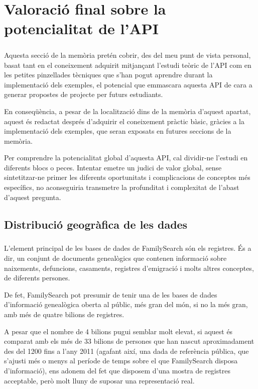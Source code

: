 \chapter{Valoració final sobre la potencialitat de l'API}

    \paragraph{}
    Aquesta secció de la memòria pretén cobrir, des del meu punt de vista personal, basat tant en el coneixement adquirit mitjançant l'estudi teòric de l'API com en les petites pinzellades tècniques que s'han pogut aprendre durant la implementació dels exemples, el potencial que emmascara aquesta API de cara a generar propostes de projecte per futurs estudiants.

    En conseqüència, a pesar de la localització dins de la memòria d'aquest apartat, aquest és redactat després d'adquirir el coneixement pràctic bàsic, gràcies a la implementació dels exemples, que seran exposats en futures seccions de la memòria.

    Per comprendre la potencialitat global d'aquesta API, cal dividir-ne l'estudi en diferents blocs o peces. Intentar emetre un judici de valor global, sense sintetitzar-ne primer les diferents oportunitats i complicacions de conceptes més específics, no aconseguiria transmetre la profunditat i complexitat de l'abast d'aquest pregunta.

\section{Distribució geogràfica de les dades}

    \paragraph{}
    L'element principal de les bases de dades de FamilySearch són els registres. És a dir, un conjunt de documents genealògics que contenen informació sobre naixements, defuncions, casaments, registres d'emigració i molts altres conceptes, de diferents persones.

    De fet, FamilySearch pot presumir de tenir una de les bases de dades d'informació genealògica oberta al públic, més gran del món, si no la més gran, amb més de quatre bilions de registres.

    A pesar que el nombre de 4 bilions pugui semblar molt elevat, si aquest és comparat amb els més de 33 bilions de persones que han nascut aproximadament des del 1200 fins a l'any 2011 (agafant així, una dada de referència pública, que s'ajusti més o menys al període de temps sobre el que FamilySearch disposa d'informació), ens adonem del fet que disposem d'una mostra de registres acceptable, però molt lluny de suposar una representació real.

